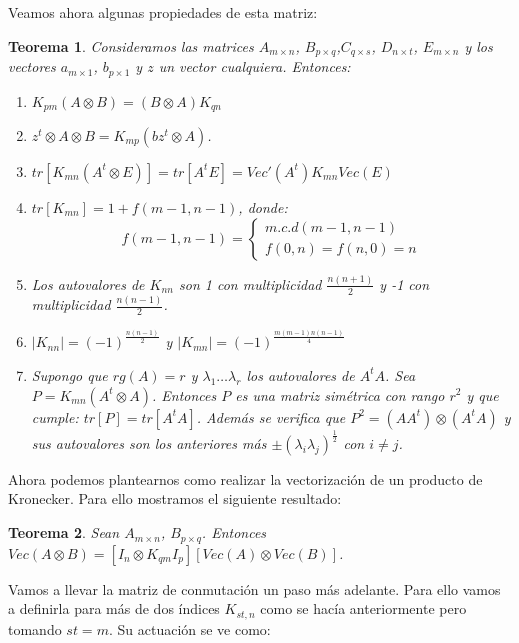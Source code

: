 \documentclass{article}
\theoremstyle{theorem-style}  %
\newtheorem{theorem}{Teorema}[section]  %
\theoremstyle{definition}
\theoremstyle{example-style}
\begin{document}
Veamos ahora algunas propiedades de esta matriz:

\begin{theorem}
	Consideramos las matrices $A_{m \times n}$, $B_{p \times q}$,$C_{q \times s}$, $D_{n \times t}$, $E_{m \times n}$ y los vectores $a_{m \times 1}$, $b_{p \times 1}$ y $z$ un vector cualquiera. Entonces:
	
	\begin{enumerate}
		\item $K_{pm}(A \otimes B) = (B \otimes A) K_{qn}$
		\item $z^t \otimes A \otimes B = K_{mp}(bz^t \otimes A)$.
		\item $tr[K_{mn}(A^t \otimes E)]=tr[A^tE]= Vec'(A^t)K_{mn}Vec(E)$
		\item $tr[K_{mn}]=1+f(m-1,n-1)$, donde:
		$$f(m-1,n-1) = \begin{cases} m.c.d(m-1, n-1)\\ f(0,n)=f(n,0)=n \end{cases} $$
		\item Los autovalores de $K_{nn}$ son 1 con multiplicidad $\frac{n(n+1)}{2}$ y -1 con multiplicidad $\frac{n(n-1)}{2}$.
		\item $|K_{nn}|= (-1)^{\frac{n(n-1)}{2}}$ y $|K_{mn}|=(-1)^{\frac{m(m-1)n(n-1)}{4}}$
		
		\item Supongo que $rg(A)=r$ y $\lambda_1 \dots \lambda_r$ los autovalores de $A^tA$. Sea $P=K_{mn}(A^t \otimes A)$. Entonces $P$ es una matriz simétrica con rango $r^2$ y que cumple: $tr[P]= tr[A^tA]$. Además se verifica que $P^2=(AA^t)\otimes(A^tA)$ y sus autovalores son los anteriores más $\pm (\lambda_i \lambda_j)^\frac{1}{2}$ con $i \neq j$.
		
	\end{enumerate} 
\end{theorem}

	Ahora podemos plantearnos como realizar la vectorización de un producto de Kronecker. Para ello mostramos el siguiente resultado:
	
	\begin{theorem}
		Sean $A_{m \times n}$, $B_{p \times q}$. Entonces $Vec(A\otimes B)= [I_n \otimes K_{qm} I_p][Vec(A) \otimes Vec(B)]$. 
	\end{theorem}
	
	Vamos a llevar la matriz de conmutación un paso más adelante. Para ello vamos a definirla para más de dos índices
	$K_{st,n}$ como se hacía anteriormente pero tomando $st=m$. Su actuación se ve como:
	
\end{document}
